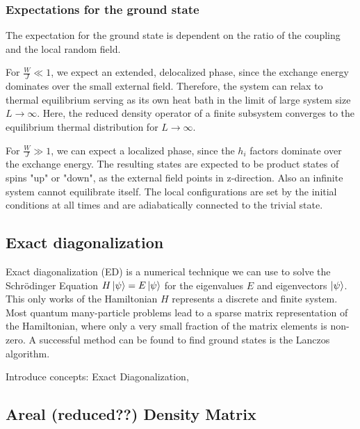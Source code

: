 \documentclass[reprint,amsmath,amssymb,aps,prb]{revtex4-2}
\begin{document}
\subsubsection{Expectations for the ground state}

The expectation for the ground state is dependent on the ratio of the coupling and the local random field. 

For $\frac{W}{J} \ll 1$, we expect an extended, delocalized phase, since the exchange energy dominates over the small external field. Therefore, the system can relax to thermal equilibrium serving as its own heat bath in the limit of large system size $L\rightarrow\infty$.
Here, the reduced density operator of a finite subsystem converges to the equilibrium thermal distribution
for $L\rightarrow\infty$.\cite{Pal2010}

For $\frac{W}{J} \gg 1$, we can expect a localized phase, since the $h_i$ factors dominate over the exchange energy. The resulting states are expected to be product states of spins "up" or "down", as the external field points in z-direction. Also an infinite system cannot equilibrate itself. The local configurations are set by the initial conditions at all times and are adiabatically connected to the trivial state.\cite{Pal2010}


\subsection{Exact diagonalization}

Exact diagonalization (ED) is a numerical technique we can use to solve the Schrödinger Equation $H\ket{\psi}=E\ket{\psi}$ for the eigenvalues $E$ and eigenvectors $\ket{\psi}$. This only works of the Hamiltonian $H$ represents a discrete and finite system. Most quantum many-particle problems lead to a sparse matrix representation of the Hamiltonian, where only a very small fraction of the matrix
elements is non-zero.\cite{Weisse2008} A successful method can be found to find ground states is the Lanczos algorithm.\cite{Lanczos1950}

Introduce concepts: Exact Diagonalization,

\subsection{Areal (reduced??) Density Matrix}
\end{document}
